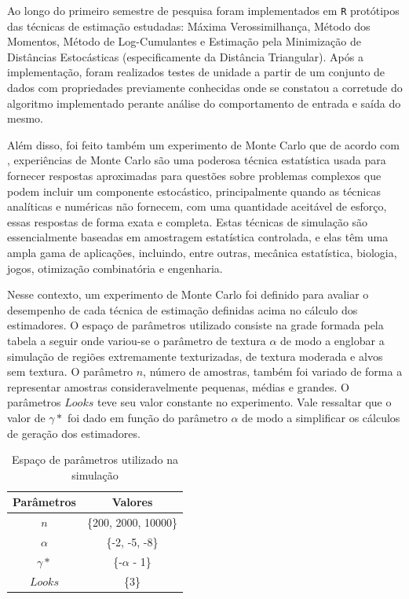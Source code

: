\documentclass[12pt]{article}
\begin{document}
Ao longo do primeiro semestre de pesquisa foram implementados em \texttt{R} protótipos das técnicas de estimação estudadas: Máxima Verossimilhança, Método dos Momentos, Método de Log-Cumulantes e Estimação pela Minimização de Distâncias Estocásticas (especificamente da Distância Triangular). Após a implementação, foram realizados testes de unidade a partir de um conjunto de dados com propriedades previamente conhecidas onde se constatou a corretude do algoritmo implementado perante análise do comportamento de entrada e saída do mesmo.

Além disso, foi feito também um experimento de Monte Carlo que de acordo com \citet{busto92}, experiências de Monte Carlo são uma poderosa técnica estatística usada para fornecer respostas aproximadas para questões sobre problemas complexos que podem incluir um componente estocástico, principalmente quando as técnicas analíticas e numéricas não fornecem, com uma quantidade aceitável de esforço, essas respostas de forma exata e completa. Estas técnicas de simulação são essencialmente baseadas em amostragem estatística controlada, e elas têm uma ampla gama de aplicações, incluindo, entre outras, mecânica estatística, biologia, jogos, otimização combinatória e engenharia.

Nesse contexto, um experimento de Monte Carlo foi definido para avaliar o desempenho de cada técnica de estimação definidas acima no cálculo dos estimadores. O espaço de parâmetros utilizado consiste na grade formada pela tabela a seguir onde variou-se o parâmetro de textura $\alpha$ de modo a englobar a simulação de regiões extremamente texturizadas, de textura moderada e alvos sem textura. O parâmetro $n$, número de amostras, também foi variado de forma a representar amostras consideravelmente pequenas, médias e grandes. O parâmetros $Looks$ teve seu valor constante no experimento. Vale ressaltar que o valor de $\gamma*$ foi dado em função do parâmetro $\alpha$ de modo a simplificar os cálculos de geração dos estimadores.
\begin{table}[H]
\centering
\caption{Espaço de parâmetros utilizado na simulação}
\smallskip
{}
\label{tab:tabela_parameters}
\begin{tabular}{c|c}
\toprule 
\multicolumn{1}{c|}{Parâmetros} & \multicolumn{1}{c}{Valores}  \\ 
\midrule
\rowcolor[gray]{.9} 
$n$ & \{200, 2000, 10000\} \\ \hline
$\alpha$ & \{-2, -5, -8\} \\ \hline
\rowcolor[gray]{.9} $\gamma*$ & \{-$\alpha$ - 1\} \\ \hline
$Looks$ & \{3\} \\ 
\bottomrule
\end{tabular}
\end{table}
\end{document}

